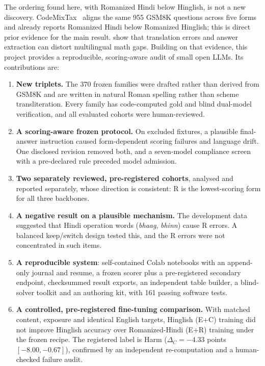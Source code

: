 \documentclass[12pt,a4paper,oneside]{report}
\renewcommand{\_}{\oldunderscore\allowbreak}
\begin{document}
The ordering found here, with Romanized Hindi below Hinglish, is not a new discovery. CodeMixTax~\citep{sthanika-2026-codemix} aligns the same 955 GSM8K questions across five forms and already reports Romanized Hindi below Romanized Hinglish; this is direct prior evidence for the main result. \citet{peter-etal-2026-mind} show that translation errors and answer extraction can distort multilingual math gaps. Building on that evidence, this project provides a reproducible, scoring-aware audit of small open LLMs. Its contributions are:
\begin{enumerate}[nosep]
\item \textbf{New triplets.} The 370 frozen families were drafted rather than derived from GSM8K and are written in natural Roman spelling rather than scheme transliteration. Every family has code-computed gold and blind dual-model verification, and all evaluated cohorts were human-reviewed.
\item \textbf{A scoring-aware frozen protocol.} On excluded fixtures, a plausible final-answer instruction caused form-dependent scoring failures and language drift. One disclosed revision removed both, and a seven-model compliance screen with a pre-declared rule preceded model admission.
\item \textbf{Two separately reviewed, pre-registered cohorts}, analysed and reported separately, whose direction is consistent: R is the lowest-scoring form for all three backbones.
\item \textbf{A negative result on a plausible mechanism.} The development data suggested that Hindi operation words (\emph{bhaag}, \emph{bhinn}) cause R errors. A balanced keep/switch design tested this, and the R errors were not concentrated in such items.
\item \textbf{A reproducible system}: self-contained Colab notebooks with an append-only journal and resume, a frozen scorer plus a pre-registered secondary endpoint, checksummed result exports, an independent table builder, a blind-solver toolkit and an authoring kit, with 161 passing software tests.
\item \textbf{A controlled, pre-registered fine-tuning comparison.} With matched content, exposure and identical English targets, Hinglish (E+C) training did not improve Hinglish accuracy over Romanized-Hindi (E+R) training under the frozen recipe. The registered label is Harm ($\Delta_C = -4.33$ points $[-8.00, -0.67]$), confirmed by an independent re-computation and a human-checked failure audit.
\end{enumerate}
\end{document}
